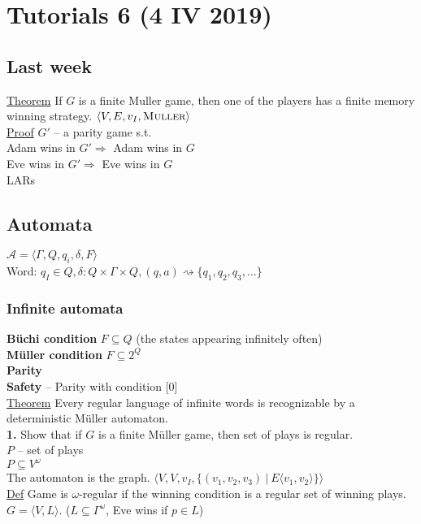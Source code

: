 \section{Tutorials 6 (4 IV 2019)}
\subsection*{Last week}
\underline{Theorem} If $G$ is a finite Muller game, then one of the players
has a finite memory winning strategy. $\langle V, E, v_I, \textsc{Muller} \rangle$\\
\underline{Proof} $G'$ -- a parity game s.t.\\
Adam wins in $G' \Rightarrow$ Adam wins in $G$\\
Eve wins in $G' \Rightarrow$ Eve wins in $G$\\
LARs
\subsection*{Automata}
$\mathcal{A} = \langle \Gamma, Q, q_i, \delta, F \rangle$\\
Word: $q_I \in Q, \delta: Q \times \Gamma \times Q, (q, a) \rightsquigarrow \{q_1, q_2, q_3, ...\}$\\
\subsubsection*{Infinite automata}
\textbf{Büchi condition} $F \subseteq Q$ (the states appearing infinitely often)\\
\textbf{Müller condition} $F \subseteq 2^Q$\\
\textbf{Parity}\\
\textbf{Safety} -- Parity with condition [0]\\
\underline{Theorem} Every regular language of infinite words is recognizable by a deterministic Müller
automaton.\\

\noindent
\textbf{1.}
Show that if $G$ is a finite Müller game, then set of plays is regular.\\

\noindent
$P$ -- set of plays\\
$P \subseteq V^\omega$\\
The automaton is the graph. $\langle V, V, v_I, \{ (v_1, v_2, v_3)\ |\ E \langle v_1, v_2 \rangle \} \rangle$\\

\noindent
\underline{Def} Game is $\omega$-regular if the winning condition is a regular set of winning plays.\\
$G = \langle V, L \rangle$. ($L \subseteq \Gamma^{\omega}$, Eve wins if $p \in L$)\\

